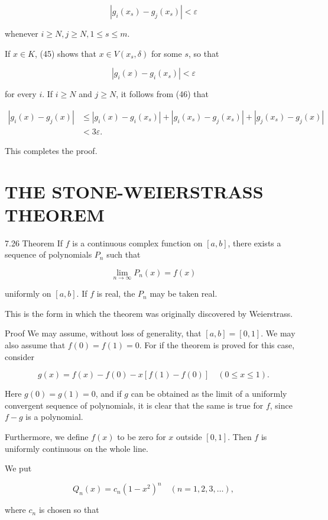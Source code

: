 \documentclass[10pt]{article}
\begin{document}
$$
\left|g_{i}\left(x_{s}\right)-g_{j}\left(x_{s}\right)\right|<\varepsilon
$$

whenever $i \geq N, j \geq N, 1 \leq s \leq m$.

If $x \in K$, (45) shows that $x \in V\left(x_{s}, \delta\right)$ for some $s$, so that

$$
\left|g_{i}(x)-g_{i}\left(x_{s}\right)\right|<\varepsilon
$$

for every $i$. If $i \geq N$ and $j \geq N$, it follows from (46) that

$$
\begin{aligned}
\left|g_{i}(x)-g_{j}(x)\right| & \leq\left|g_{i}(x)-g_{i}\left(x_{s}\right)\right|+\left|g_{i}\left(x_{s}\right)-g_{j}\left(x_{s}\right)\right|+\left|g_{j}\left(x_{s}\right)-g_{j}(x)\right| \\
& <3 \varepsilon .
\end{aligned}
$$

This completes the proof.

\section{THE STONE-WEIERSTRASS THEOREM}
7.26 Theorem If $f$ is a continuous complex function on $[a, b]$, there exists a sequence of polynomials $P_{n}$ such that

$$
\lim _{n \rightarrow \infty} P_{n}(x)=f(x)
$$

uniformly on $[a, b]$. If $f$ is real, the $P_{n}$ may be taken real.

This is the form in which the theorem was originally discovered by Weierstrass.

Proof We may assume, without loss of generality, that $[a, b]=[0,1]$. We may also assume that $f(0)=f(1)=0$. For if the theorem is proved for this case, consider

$$
g(x)=f(x)-f(0)-x[f(1)-f(0)] \quad(0 \leq x \leq 1) .
$$

Here $g(0)=g(1)=0$, and if $g$ can be obtained as the limit of a uniformly convergent sequence of polynomials, it is clear that the same is true for $f$, since $f-g$ is a polynomial.

Furthermore, we define $f(x)$ to be zero for $x$ outside $[0,1]$. Then $f$ is uniformly continuous on the whole line.

We put

$$
Q_{n}(x)=c_{n}\left(1-x^{2}\right)^{n} \quad(n=1,2,3, \ldots),
$$

where $c_{n}$ is chosen so that
\end{document}
